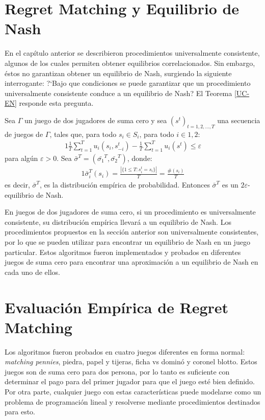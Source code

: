 \section{Regret Matching y Equilibrio de Nash}

En el capítulo anterior se describieron procedimientos universalmente consistente, algunos de los cuales permiten obtener equilibrios correlacionados. Sin embargo, éstos no garantizan obtener un equilibrio de Nash, surgiendo la siguiente interrogante: ?`Bajo que condiciones se puede garantizar que un procedimiento universalmente consistente conduce a un equilibrio de Nash? El Teorema \ref{UC-EN} responde esta pregunta.

\begin{theorem}
\label{UC-EN}
Sea $\Gamma$ un juego de dos jugadores de suma cero y sea $(s^t)_{t=1,2,..., T}$ una secuencia de juegos de $\Gamma$, tales que, para todo $s_i \in S_i$, para todo $i \in {1, 2}$:
\begin{alignat}{1}
\frac{1}{T}\sum_{t = 1}^{T}u_i(s_i, s_{-i}^t) - \frac{1}{T} \sum_{t = 1}^T u_i(s^t) \leq \varepsilon
\end{alignat}
para algún $\varepsilon > 0$. Sea $\bar{\sigma}^T = (\bar{\sigma_1}^T, \bar{\sigma_2}^T)$, donde:
\begin{alignat}{1}
\bar{\sigma}_i^T(s_i) = \frac{ |\{ 1 \leq T : s_i^t = s_i\}|}{T} = \frac{\#(s_i)}{T}
\end{alignat}
es decir, $\bar{\sigma}^T$, es la distribución empírica de probabilidad. Entonces $\bar{\sigma}^T$ es un $2\varepsilon$-equilibrio de Nash.
\end{theorem}


En juegos de dos jugadores de suma cero, si un procedimiento es universalmente consistente, su distribución empírica llevará a un equilibrio de Nash. Los procedimientos propuestos en la sección anterior son universalmente consistentes, por lo que se pueden utilizar para encontrar un equilibrio de Nash en un juego particular. Estos algoritmos fueron implementados y probados en diferentes juegos de suma cero para encontrar una aproximación a un equilibrio de Nash en cada uno de ellos.


\section{Evaluación Empírica de Regret Matching}

Los algoritmos fueron probados en cuatro juegos diferentes en forma normal: \textit{matching pennies}, piedra, papel y tijeras, ficha vs dominó y coronel blotto. Estos juegos son de suma cero para dos persona, por lo tanto es suficiente con determinar el pago para del primer jugador para que el juego esté bien definido. Por otra parte, cualquier juego con estas características puede modelarse como un problema de programación lineal \cite[pp. 228-233]{bib:pl-chvatal} y resolverse mediante procedimientos destinados para esto.


